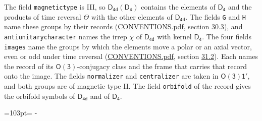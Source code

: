 \documentclass[10pt,a4paper]{article}
\newcommand{\needspace}[1]{\par\penalty-100\begingroup\dimen0=#1\relax\dimen2=\pagegoal
  \advance\dimen2-\pagetotal\ifdim\dimen0>\dimen2\relax\ifdim\dimen2>0pt\vfil\break\fi\fi
  \endgroup}
\numberwithin{equation}{section}
\newcommand{\grp}[1]{\mathsf{#1}}
\begin{document}
The field \texttt{magnetictype} is III, so $\grp{D_{4d}}(\grp{D_{4}})$ contains the elements of $\grp{D_{4}}$ and the products of time reversal $\varTheta$ with the other elements of $\grp{D_{4d}}$. The fields \texttt{G} and \texttt{H} name these groups by their records (\href{../../CONVENTIONS.pdf}{CONVENTIONS.pdf}, section \href{../../CONVENTIONS.pdf\#conv.30.3}{30.3}), and \texttt{antiunitarycharacter} names the irrep $\chi$ of $\grp{D_{4d}}$ with kernel $\grp{D_{4}}$. The four fields \texttt{images} name the groups by which the elements move a polar or an axial vector, even or odd under time reversal (\href{../../CONVENTIONS.pdf}{CONVENTIONS.pdf}, section \href{../../CONVENTIONS.pdf\#conv.31.2}{31.2}). Each names the record of its $\grp{O(3)}$-conjugacy class and the frame that carries that record onto the image. The fields \texttt{normalizer} and \texttt{centralizer} are taken in $\grp{O(3)1'}$, and both groups are of magnetic type II. The field \texttt{orbifold} of the record gives the orbifold symbols of $\grp{D_{4d}}$ and of $\grp{D_{4}}$.
\needspace{103pt}
\end{document}
